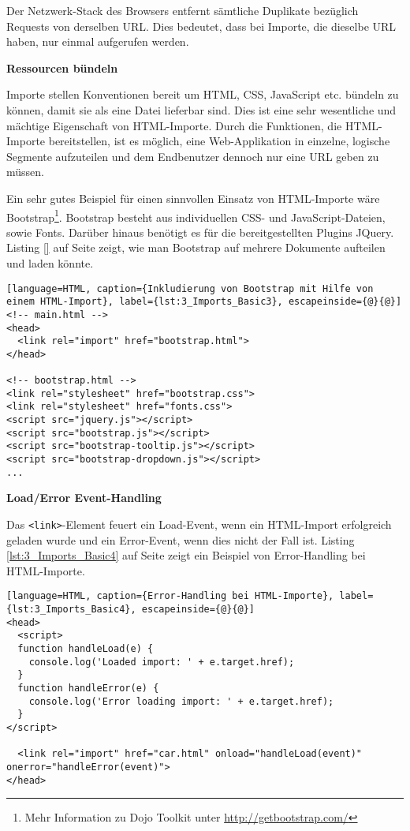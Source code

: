 Der Netzwerk-Stack des Browsers entfernt sämtliche Duplikate bezüglich Requests von derselben URL. Dies bedeutet, dass bei Importe, die dieselbe URL haben, nur einmal aufgerufen werden.

\textbf{Ressourcen bündeln}

Importe stellen Konventionen bereit um HTML, CSS, JavaScript etc. bündeln zu können, damit sie als eine Datei lieferbar sind. Dies ist eine sehr wesentliche und mächtige Eigenschaft von HTML-Importe. Durch die Funktionen, die HTML-Importe bereitstellen, ist es möglich, eine Web-Applikation in einzelne, logische Segmente aufzuteilen und dem Endbenutzer dennoch nur eine URL geben zu müssen.

Ein sehr gutes Beispiel für einen sinnvollen Einsatz von HTML-Importe wäre Bootstrap\footnote{Mehr Information zu Dojo Toolkit unter \href{http://getbootstrap.com/}{http://getbootstrap.com/}}. Bootstrap besteht aus individuellen CSS- und JavaScript-Dateien, sowie Fonts. Darüber hinaus benötigt es für die bereitgestellten Plugins JQuery. Listing \ref{} auf Seite \pageref{} zeigt, wie man Bootstrap auf mehrere Dokumente aufteilen und laden könnte.

\begin{lstlisting}[language=HTML, caption={Inkludierung von Bootstrap mit Hilfe von einem HTML-Import}, label={lst:3_Imports_Basic3}, escapeinside={@}{@}]
<!-- main.html -->
<head>
  <link rel="import" href="bootstrap.html">
</head>

<!-- bootstrap.html -->
<link rel="stylesheet" href="bootstrap.css">
<link rel="stylesheet" href="fonts.css">
<script src="jquery.js"></script>
<script src="bootstrap.js"></script>
<script src="bootstrap-tooltip.js"></script>
<script src="bootstrap-dropdown.js"></script>
...
\end{lstlisting}

\textbf{Load/Error Event-Handling}

Das \lstinline|<link>|-Element feuert ein \glqq Load\grqq -Event, wenn ein HTML-Import erfolgreich geladen wurde und ein \glqq Error\grqq -Event, wenn dies nicht der Fall ist. Listing \ref{lst:3_Imports_Basic4} auf Seite \pageref{lst:3_Imports_Basic4} zeigt ein Beispiel von Error-Handling bei HTML-Importe.

\begin{lstlisting}[language=HTML, caption={Error-Handling bei HTML-Importe}, label={lst:3_Imports_Basic4}, escapeinside={@}{@}]
<head>
  <script>
  function handleLoad(e) {
    console.log('Loaded import: ' + e.target.href);
  }
  function handleError(e) {
    console.log('Error loading import: ' + e.target.href);
  }
</script>

  <link rel="import" href="car.html" onload="handleLoad(event)" onerror="handleError(event)">
</head>
\end{lstlisting}

